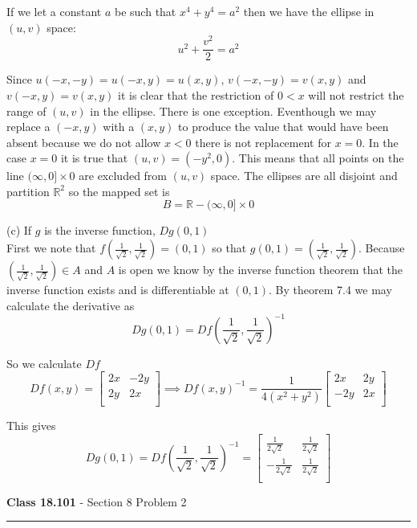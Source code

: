 \documentclass[11pt,reqno]{article}
\begin{document}
If we let a constant $a$ be such that $x^4 + y^4 = a^2$ then we have the ellipse in $(u,v)$ space:
\[ u^2  + \frac{v^2}{2} = a^2 \]
 
Since $u(-x,-y) = u(-x,y) = u(x,y)$, $v(-x,-y) = v(x,y)$ and $v(-x,y) = v(x,y)$ it is clear that the restriction of $0 < x$ will not restrict the range of $(u,v)$ in the ellipse. There is one exception. Eventhough we may replace a $(-x,y)$ with a $(x,y)$ to produce the value that would have been absent because we do not allow $x < 0$ there is not replacement for $x = 0$. In the case $x = 0$ it is true that $(u,v) = (-y^2,0)$. This means that all points on the line $(\infty,0] \times 0$ are excluded from $(u,v)$ space. The ellipses are all disjoint and partition $\mathbb{R}^2$ so the mapped set is 
\[ B = \mathbb{R} - (\infty,0] \times 0 \]

\noindent (c) If $g$ is the inverse function, $D g(0,1)$\\

First we note that $f(\frac{1}{\sqrt{2}},\frac{1}{\sqrt{2}}) = (0,1)$ so that $g(0,1) = (\frac{1}{\sqrt{2}},\frac{1}{\sqrt{2}})$. Because $(\frac{1}{\sqrt{2}},\frac{1}{\sqrt{2}}) \in A$ and $A$ is open we know by the inverse function theorem that the inverse function exists and is differentiable at $(0,1)$. By theorem 7.4 we may calculate the derivative as
\[ D g(0,1) = D f(\frac{1}{\sqrt{2}},\frac{1}{\sqrt{2}})^{-1} \]

\noindent So we calculate $D f$
\[ D f(x,y) = \left[ \begin{array}{cc}
2x & -2y \\
2y & 2x \\
\end{array} \right] \implies D f(x,y)^{-1} = \frac{1}{4(x^2 + y^2)} \left[ \begin{array}{cc}
2x & 2y \\
-2y & 2x \\
\end{array} \right] \]

\noindent This gives 
\[ D g(0,1) = D f(\frac{1}{\sqrt{2}},\frac{1}{\sqrt{2}})^{-1} =  \left[ \begin{array}{cc}
\frac{1}{2 \sqrt{2}} & \frac{1}{2 \sqrt{2}}  \\
-\frac{1}{2 \sqrt{2}}  & \frac{1}{2 \sqrt{2}}  \\
\end{array} \right] \]

\begin{flushleft} 
\textbf{Class 18.101} - Section 8 Problem 2\\
\rule{500pt}{1pt}\\
\end{flushleft} 
\end{document}
